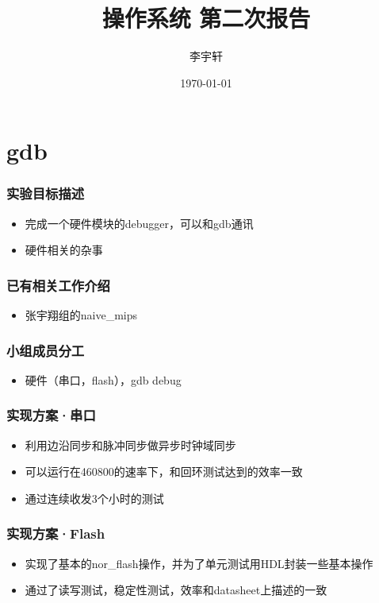 ﻿\documentclass[11pt]{beamer}
\title{操作系统 \quad 第二次报告}
\author{李宇轩}
\date{\today}
\date{}
\begin{document}
\maketitle

\section{gdb}

\begin{frame}
\frametitle{实验目标描述}
\begin{itemize}
\item 完成一个硬件模块的debugger，可以和gdb通讯
\item 硬件相关的杂事
\end{itemize}
\end{frame}

\begin{frame}
\frametitle{已有相关工作介绍}
\begin{itemize}
\item 张宇翔组的naive\_mips
\end{itemize}
\end{frame}

\begin{frame}
\frametitle{小组成员分工}
\begin{itemize}
\item 硬件（串口，flash），gdb debug
\end{itemize}
\end{frame}

\begin{frame}
\frametitle{实现方案·串口}
\begin{itemize}
\item 利用边沿同步和脉冲同步做异步时钟域同步
\item 可以运行在460800的速率下，和回环测试达到的效率一致
\item 通过连续收发3个小时的测试
\end{itemize}
\end{frame}

\begin{frame}
\frametitle{实现方案·Flash}
\begin{itemize}
\item 实现了基本的nor\_flash操作，并为了单元测试用HDL封装一些基本操作
\item 通过了读写测试，稳定性测试，效率和datasheet上描述的一致
\end{itemize}
\end{frame}
\end{document}
